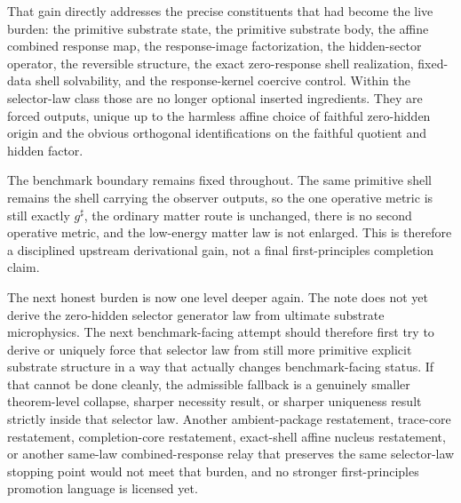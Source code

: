 \documentclass[11pt]{article}
\newcommand{\CompletedMetric}{g^{\sharp}}
\begin{document}
That gain directly addresses the precise constituents that had become the live burden: the primitive substrate state, the primitive substrate body, the affine combined response map, the response-image factorization, the hidden-sector operator, the reversible structure, the exact zero-response shell realization, fixed-data shell solvability, and the response-kernel coercive control. Within the selector-law class those are no longer optional inserted ingredients. They are forced outputs, unique up to the harmless affine choice of faithful zero-hidden origin and the obvious orthogonal identifications on the faithful quotient and hidden factor.

The benchmark boundary remains fixed throughout. The same primitive shell remains the shell carrying the observer outputs, so the one operative metric is still exactly \(\CompletedMetric\), the ordinary matter route is unchanged, there is no second operative metric, and the low-energy matter law is not enlarged. This is therefore a disciplined upstream derivational gain, not a final first-principles completion claim.

The next honest burden is now one level deeper again. The note does not yet derive the zero-hidden selector generator law from ultimate substrate microphysics. The next benchmark-facing attempt should therefore first try to derive or uniquely force that selector law from still more primitive explicit substrate structure in a way that actually changes benchmark-facing status. If that cannot be done cleanly, the admissible fallback is a genuinely smaller theorem-level collapse, sharper necessity result, or sharper uniqueness result strictly inside that selector law. Another ambient-package restatement, trace-core restatement, completion-core restatement, exact-shell affine nucleus restatement, or another same-law combined-response relay that preserves the same selector-law stopping point would not meet that burden, and no stronger first-principles promotion language is licensed yet.
\end{document}
